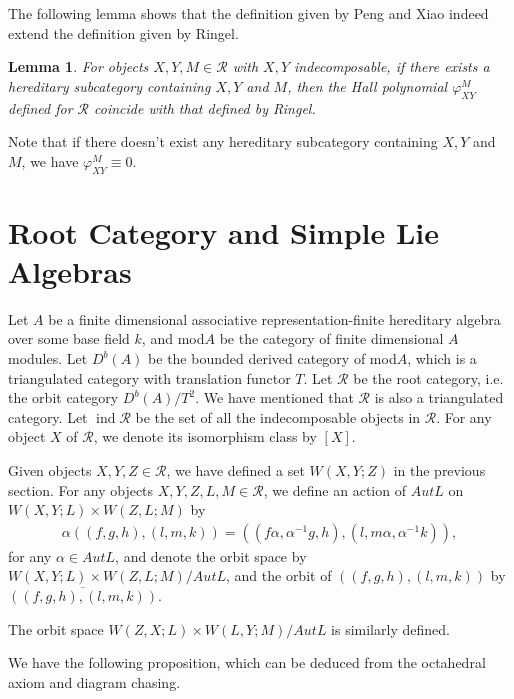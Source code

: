 \documentclass[12pt]{amsart}
\newtheorem{lemma}[theorem]{Lemma}
\begin{document}
The following lemma shows that the definition given by Peng and Xiao indeed extend the definition given by Ringel.
\begin{lemma}\cite[Lemma 3.1]{1997ROOT}
    For objects $X,Y,M\in \mathcal{R}$ with $X,Y$ indecomposable, if there exists a hereditary subcategory containing $X,Y$ and $M$, then the Hall polynomial $\varphi_{XY}^M$ defined for $\mathcal{R}$ coincide with that defined by Ringel. 
\end{lemma}

Note that if there doesn't exist any hereditary subcategory containing $X,Y$ and $M$, we have $\varphi^M_{XY}\equiv 0$.




\section{Root Category and Simple Lie Algebras}
Let $A$ be a finite dimensional associative representation-finite hereditary algebra over some base field $k$, and mod$A$ be the category of finite dimensional $A$ modules.
Let $D^b(A)$ be the bounded derived category of mod$A$, which is a triangulated category with translation functor $T$.
Let $\mathcal{R}$ be the root category, i.e. the orbit category $D^b(A)/T^2$. 
We have mentioned that $\mathcal{R}$ is also a triangulated category.
Let $\operatorname{ind} \mathcal{R}$ be the set of all the indecomposable objects in $\mathcal{R}$.
For any object $X$ of $\mathcal{R}$, we denote its isomorphism class by $[X]$. 

Given objects $X,Y,Z \in \mathcal{R}$, we have defined a set $W(X,Y;Z)$ in the previous section.
For any objects $X,Y,Z,L,M \in \mathcal{R}$, we define an action of $Aut L$ on $W(X,Y;L)\times W(Z,L;M)$ by 
\begin{align*}
\alpha ((f,g,h),(l,m,k))=((f\alpha,\alpha^{-1}g,h),(l,m\alpha,\alpha^{-1}k)),
\end{align*}
for any $\alpha \in AutL$,
and denote the orbit space by $W(X,Y;L)\times W(Z,L;M)/Aut L$, and the orbit of  $((f,g,h),(l,m,k))$ by $\overline{((f,g,h),(l,m,k))}$.

The orbit space $W(Z,X;L)\times W(L,Y;M)/Aut L$ is similarly defined.

We have the following proposition, which can be deduced from the octahedral axiom and diagram chasing.
\end{document}
